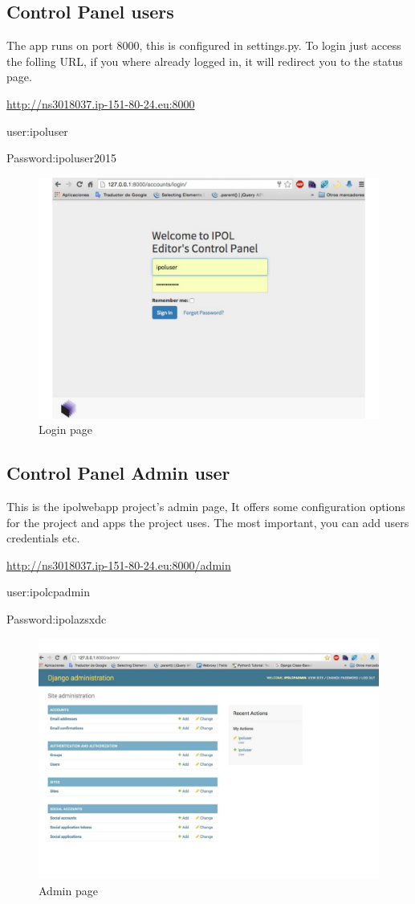 \subsection{Control Panel users}
The app runs on port 8000, this is configured in settings.py.
To login just access the folling URL, if you where already logged in, it will redirect you to the status page.

\url{http://ns3018037.ip-151-80-24.eu:8000}

user:ipoluser

Password:ipoluser2015

\begin{figure}[!ht]
\centering
\includegraphics[width=0.5\columnwidth]{images/login.pdf}
\caption{Login page} 
\label{fi:login_page}
\end{figure}

\subsection{Control Panel Admin user}
This is the ipolwebapp project's admin page, 
It offers some configuration options for the project and apps the project uses. The most important, you can add users credentials etc.

\url{http://ns3018037.ip-151-80-24.eu:8000/admin}

user:ipolcpadmin

Password:ipolazsxdc

\begin{figure}[!ht]
\centering
\includegraphics[width=0.5\columnwidth]{images/admin.pdf}
\caption{Admin page} 
\label{fi:admin_page}
\end{figure}


